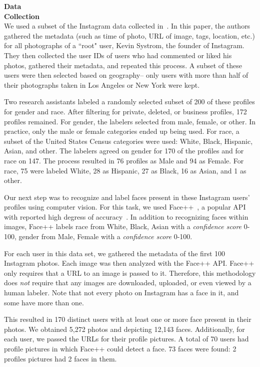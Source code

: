 \textbf{Data} \\
\textbf{Collection} \\
We used a subset of the Instagram data collected in~\cite{riederer2015cosn}.
In this paper, the authors gathered the metadata (such as time of photo, URL of image, tags, location, etc.) for all photographs of a ``root" user, Kevin Systrom, the founder of Instagram.
They then collected the user IDs of users who had commented or liked his photos, gathered their metadata, and repeated this process.
A subset of these users were then selected based on geography-- only users with more than half of their photographs taken in Los Angeles or New York were kept.

Two research assistants labeled a randomly selected subset of 200 of these profiles for gender and race.
After filtering for private, deleted, or business profiles, 172 profiles remained.
For gender, the labelers selected from male, female, or other.
In practice, only the male or female categories ended up being used.
For race, a subset of the United States Census categories were used: White, Black, Hispanic, Asian, and other.
The labelers agreed on gender for 170 of the profiles and for race on 147.
The process resulted in 76 profiles as Male and 94 as Female.
For race, 75 were labeled White, 28 as Hispanic, 27 as Black, 16 as Asian, and 1 as other.

Our next step was to recognize and label faces present in these Instagram users' profiles using computer vision.
For this task, we used Face++~\cite{faceplusplus}, a popular API with reported high degress of accuracy~\cite{bakhshi2014faces}.
In addition to recognizing faces within images, Face++ labels race from {White, Black, Asian} with a \emph{confidence score} 0-100, gender from {Male, Female} with a \emph{confidence score} 0-100.

For each user in this data set, we gathered the metadata of the first 100 Instagram photos.
Each image was then analyzed with the Face++ API.
Face++ only requires that a URL to an image is passed to it.
Therefore, this methodology does \emph{not} require that any images are downloaded, uploaded, or even viewed by a human labeler.
Note that not every photo on Instagram has a face in it, and some have more than one.

This resulted in 170 distinct users with at least one or more face present in their photos.
We obtained 5,272 photos and depicting 12,143 faces. 
Additionally, for each user, we passed the URLs for their profile pictures.
A total of 70 users had profile pictures in which Face++ could detect a face.
73 faces were found: 2 profiles pictures had 2 faces in them.

